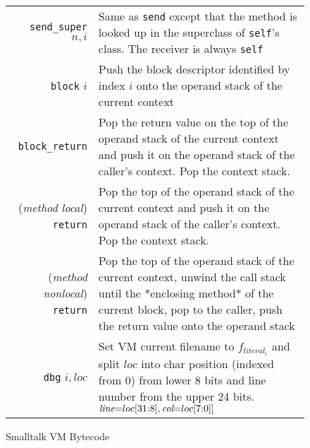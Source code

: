 \documentclass[11pt]{article}
\begin{document}
\begin{figure}
\begin{center}
\begin{tabular}[t]{r | l}
{\tt send\_super} $n,i$ & \begin{minipage}[t]{.76\linewidth}Same as {\tt send} except that the method is looked up in the superclass of {\tt self}'s class. The receiver is always {\tt self}\end{minipage} \\

{\tt block} $i$  & \begin{minipage}[t]{.76\linewidth}Push the block descriptor identified by index $i$ onto the operand stack of the current context\end{minipage} \\

{\tt block\_return} & \begin{minipage}[t]{.76\linewidth} Pop the return value on the top of the operand stack of the current context and push it on the operand stack of the caller's context. Pop the context stack.\end{minipage} \\

({\em method local}) ~~{\tt return} & \begin{minipage}[t]{.76\linewidth}Pop the top of the operand stack of the current context and push it on the operand stack of the caller's context. Pop the context stack.\end{minipage} \\

({\em method nonlocal}) ~~{\tt return} & \begin{minipage}[t]{.76\linewidth}Pop the top of the operand stack of the current context, unwind the call stack until the *enclosing method* of the current block, pop to the caller, push the return value onto the operand stack\end{minipage} \\

\hline

{\tt dbg} $i, loc$ & 
\begin{minipage}[t]{.76\linewidth}
Set VM current filename to $f_{literal_i}$ and split $loc$ into char position (indexed from 0) from lower 8 bits and line number  from the upper 24 bits. $\text{\it line}\text{=}loc[31\text{:}8], \text{\it col}\text{=}loc[7\text{:}0]]$
\end{minipage}\\

\end{tabular}
\end{center}
\vspace{-10pt}
\caption{Smalltalk VM Bytecode}
\label{default}
\end{figure}%
\end{document}
